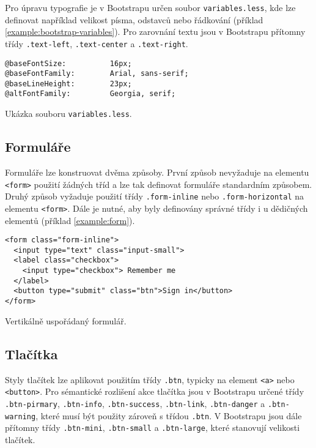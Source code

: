 Pro úpravu typografie je v Bootstrapu určen soubor \texttt{variables.less}, kde lze definovat například velikost písma, odstavců nebo řádkování (příklad \ref{example:bootstrap-variables}). Pro zarovnání textu jsou v Bootstrapu přítomny třídy \texttt{.text-left}, \texttt{.text-center} a \texttt{.text-right}. \cite{19}

\begin{example}
    \centering
    \begin{lstlisting}
@baseFontSize:          16px;
@baseFontFamily:        Arial, sans-serif;
@baseLineHeight:        23px;
@altFontFamily:         Georgia, serif;
    \end{lstlisting}
    \caption{Ukázka souboru \texttt{variables.less}.}
    \label{example:bootstrap-variables}
\end{example}

\subsection{Formuláře}

Formuláře lze konstruovat dvěma způsoby. První způsob nevyžaduje na elementu \texttt{<form>} použití žádných tříd a lze tak definovat formuláře standardním způsobem. Druhý způsob vyžaduje použití třídy \texttt{.form-inline} nebo \texttt{.form-horizontal} na elementu \texttt{<form>}. Dále je nutné, aby byly definovány správné třídy i u dědičných elementů (příklad \ref{example:form}). \cite{19}

\begin{example}
    \centering
    \begin{lstlisting}
<form class="form-inline">
  <input type="text" class="input-small">
  <label class="checkbox">
    <input type="checkbox"> Remember me
  </label>
  <button type="submit" class="btn">Sign in</button>
</form>
    \end{lstlisting}
    \caption{Vertikálně uspořádaný formulář.}
    \label{example:form}
\end{example}

\subsection{Tlačítka}

Styly tlačítek lze aplikovat použitím třídy \texttt{.btn}, typicky na element \texttt{<a>} nebo \texttt{<button>}. Pro sémantické rozlišení akce tlačítka jsou v Bootstrapu určené třídy \texttt{.btn-pirmary}, \texttt{.btn-info}, \texttt{.btn-success}, \texttt{.btn-link}, \texttt{.btn-danger} a \texttt{.btn-warning}, které musí být použity zároveň s třídou \texttt{.btn}. V Bootstrapu jsou dále přítomny třídy \texttt{.btn-mini}, \texttt{.btn-small} a \texttt{.btn-large}, které stanovují velikosti tlačítek. \cite{19}

